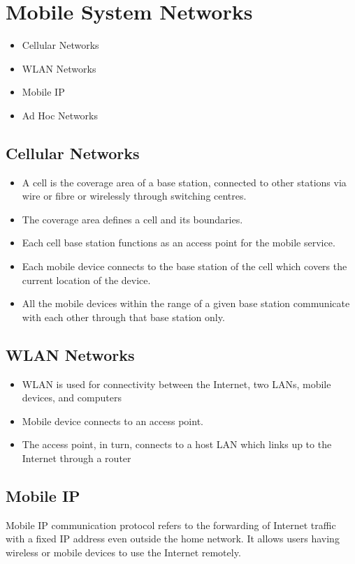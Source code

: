 \section{Mobile System Networks}
\begin{multicols}{2}
	\begin{itemize}
		\item Cellular Networks
		\item WLAN Networks
		\item Mobile IP
		\item Ad Hoc Networks
	\end{itemize}
\end{multicols}


\subsection*{Cellular Networks}
\begin{itemize}
\item A cell is the coverage area of a base station, connected to other stations via wire
or fibre or wirelessly through switching centres.
\item The coverage area defines a cell and its boundaries.
\item Each cell base station functions as an access point for the mobile service.
\item Each mobile device connects to the base station of the cell which covers the
current location of the device.
\item All the mobile devices within the range of a given base station communicate with
each other through that base station only.
\end{itemize}

\subsection*{WLAN Networks}
\begin{itemize}
\item WLAN is used for connectivity between the Internet, two LANs, mobile devices, and
computers
\item Mobile device connects to an access point.
\item The access point, in turn, connects to a host LAN which links up to the Internet through a
router
\end{itemize}

\subsection*{Mobile IP}
Mobile IP communication protocol refers to the forwarding of Internet traffic with a fixed IP
address even outside the home network. It allows users having wireless or mobile devices
to use the Internet remotely.
\par

